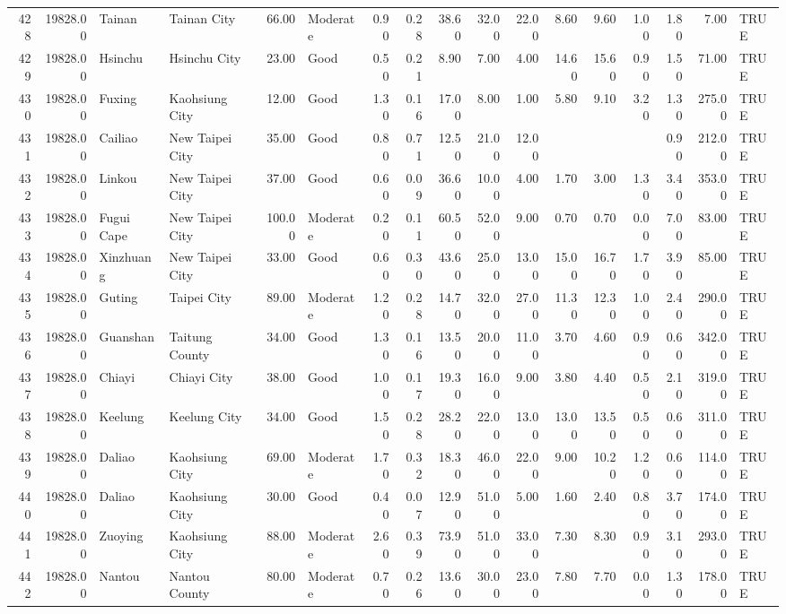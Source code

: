 \begin{table}[ht]
\begin{tabular}{rrllrlrrrrrrrrrrl}
  428 & 19828.00 & Tainan & Tainan City & 66.00 & Moderate & 0.90 & 0.28 & 38.60 & 32.00 & 22.00 & 8.60 & 9.60 & 1.00 & 1.80 & 7.00 & TRUE \\ 
  429 & 19828.00 & Hsinchu & Hsinchu City & 23.00 & Good & 0.50 & 0.21 & 8.90 & 7.00 & 4.00 & 14.60 & 15.60 & 0.90 & 1.50 & 71.00 & TRUE \\ 
  430 & 19828.00 & Fuxing & Kaohsiung City & 12.00 & Good & 1.30 & 0.16 & 17.00 & 8.00 & 1.00 & 5.80 & 9.10 & 3.20 & 1.30 & 275.00 & TRUE \\ 
  431 & 19828.00 & Cailiao & New Taipei City & 35.00 & Good & 0.80 & 0.71 & 12.50 & 21.00 & 12.00 &  &  &  & 0.90 & 212.00 & TRUE \\ 
  432 & 19828.00 & Linkou & New Taipei City & 37.00 & Good & 0.60 & 0.09 & 36.60 & 10.00 & 4.00 & 1.70 & 3.00 & 1.30 & 3.40 & 353.00 & TRUE \\ 
  433 & 19828.00 & Fugui Cape & New Taipei City & 100.00 & Moderate & 0.20 & 0.11 & 60.50 & 52.00 & 9.00 & 0.70 & 0.70 & 0.00 & 7.00 & 83.00 & TRUE \\ 
  434 & 19828.00 & Xinzhuang & New Taipei City & 33.00 & Good & 0.60 & 0.30 & 43.60 & 25.00 & 13.00 & 15.00 & 16.70 & 1.70 & 3.90 & 85.00 & TRUE \\ 
  435 & 19828.00 & Guting & Taipei City & 89.00 & Moderate & 1.20 & 0.28 & 14.70 & 32.00 & 27.00 & 11.30 & 12.30 & 1.00 & 2.40 & 290.00 & TRUE \\ 
  436 & 19828.00 & Guanshan & Taitung County & 34.00 & Good & 1.30 & 0.16 & 13.50 & 20.00 & 11.00 & 3.70 & 4.60 & 0.90 & 0.60 & 342.00 & TRUE \\ 
  437 & 19828.00 & Chiayi & Chiayi City & 38.00 & Good & 1.00 & 0.17 & 19.30 & 16.00 & 9.00 & 3.80 & 4.40 & 0.50 & 2.10 & 319.00 & TRUE \\ 
  438 & 19828.00 & Keelung & Keelung City & 34.00 & Good & 1.50 & 0.28 & 28.20 & 22.00 & 13.00 & 13.00 & 13.50 & 0.50 & 0.60 & 311.00 & TRUE \\ 
  439 & 19828.00 & Daliao & Kaohsiung City & 69.00 & Moderate & 1.70 & 0.32 & 18.30 & 46.00 & 22.00 & 9.00 & 10.20 & 1.20 & 0.60 & 114.00 & TRUE \\ 
  440 & 19828.00 & Daliao & Kaohsiung City & 30.00 & Good & 0.40 & 0.07 & 12.90 & 51.00 & 5.00 & 1.60 & 2.40 & 0.80 & 3.70 & 174.00 & TRUE \\ 
  441 & 19828.00 & Zuoying & Kaohsiung City & 88.00 & Moderate & 2.60 & 0.39 & 73.90 & 51.00 & 33.00 & 7.30 & 8.30 & 0.90 & 3.10 & 293.00 & TRUE \\ 
  442 & 19828.00 & Nantou & Nantou County & 80.00 & Moderate & 0.70 & 0.26 & 13.60 & 30.00 & 23.00 & 7.80 & 7.70 & 0.00 & 1.30 & 178.00 & TRUE \\ 

\end{tabular}
\end{table}
